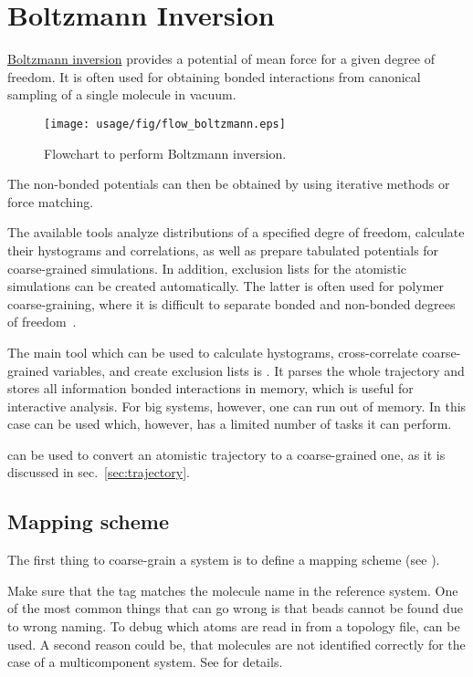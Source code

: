 \chapter{Boltzmann Inversion}

\hyperref[sec:bi]{Boltzmann inversion} provides a potential of mean force for a given degree of freedom. It is often used for obtaining bonded interactions from canonical sampling of a single molecule in vacuum. 
%
\begin{wrapfigure}{t}{7cm}
   \centering
   \texttt{[image: usage/fig/flow\_boltzmann.eps]}
   \caption{Flowchart to perform Boltzmann inversion.}
\end{wrapfigure}
%
The non-bonded potentials can then be obtained by using iterative  methods or force matching.

The available tools analyze distributions of a specified degre of freedom, calculate their hystograms and correlations, as well as prepare tabulated potentials for coarse-grained simulations. In addition, exclusion lists for the atomistic simulations can be created automatically. The latter is often used for polymer coarse-graining, where it is difficult to separate bonded and non-bonded degrees of freedom~\cite{Tschoep:1998}.

The main tool which can be used to calculate hystograms, cross-correlate coarse-grained variables, and create exclusion lists is .  It parses the whole trajectory and stores all information bonded interactions in memory, which is useful for interactive analysis. For big systems, however, one can run out of memory. In this case  can be used which, however, has a limited number of tasks it can perform.

 can be used to convert an atomistic trajectory to a coarse-grained one, as it is discussed in sec.~\ref{sec:trajectory}.

\section{Mapping scheme}
The first thing to coarse-grain a system is to define a mapping scheme (see ). 

Make sure that the  tag matches the molecule name in the reference system. One of the most common things that can go wrong is that beads cannot be found due to wrong naming. To debug which atoms are read in from a topology file,  can be used. A second reason could be, that molecules are not identified correctly for the case of a multicomponent system. See  for details.

